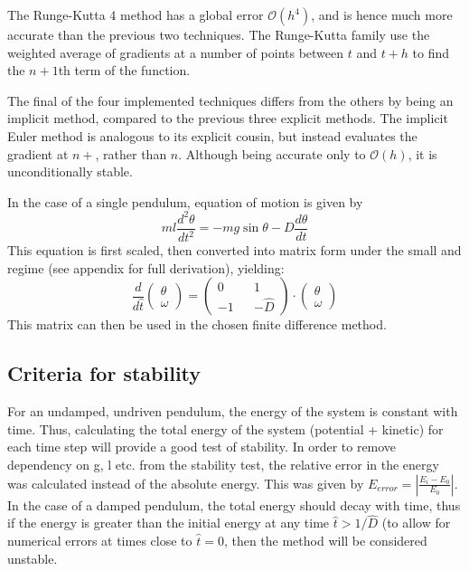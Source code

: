 \documentclass[a4paper,11pt]{article}
\begin{document}
	The Runge-Kutta 4 method has a global error $\mathcal{O}\left(h^4\right)$\cite{jameson1981numerical}, and is hence much more accurate than the previous two techniques. The Runge-Kutta family use the weighted average of gradients at a number of points between $t$ and $t+h$ to find the $n+1$th term of the function.
	
	The final of the four implemented techniques differs from the others by being an implicit method, compared to the previous three explicit methods. The implicit Euler method is analogous to its explicit cousin, but instead evaluates the gradient at $n+$, rather than $n$. Although being accurate only to $\mathcal{O}\left(h\right)$, it is unconditionally stable\cite{butcher1987numerical}.
	
	In the case of a single pendulum, equation of motion is given by
	\begin{equation}
	ml\frac{d^2\theta}{dt^2}=-mg\sin\theta-D\frac{d\theta}{dt}
	\end{equation}
	This equation is first scaled, then converted into matrix form under the small and regime (see appendix for full derivation), yielding:
	\begin{equation}
	\frac{d}{d\hat{t}}\begin{pmatrix}\theta\\\omega\end{pmatrix} = \begin{pmatrix}0&&1\\-1&&-\hat{D}\end{pmatrix} \cdot\begin{pmatrix}\theta\\\omega\end{pmatrix}
	\end{equation}
	This matrix can then be used in the chosen finite difference method.
	
	\subsection{Criteria for stability}
	For an undamped, undriven pendulum, the energy of the system is constant with time. Thus, calculating the total energy of the system (potential + kinetic) for each time step will provide a good test of stability. In order to remove dependency on g, l etc. from the stability test, the relative error in the energy was calculated instead of the absolute energy. This was given by $E_{error} = |\frac{E_i-E_0}{E_0}|$.	In the case of a damped pendulum, the total energy should decay with time, thus if the energy is greater than the initial energy at any time $\hat{t}>1/\hat{D}$ (to allow for numerical errors at times close to $\hat{t}=0$, then the method will be considered unstable.
	
\end{document}
